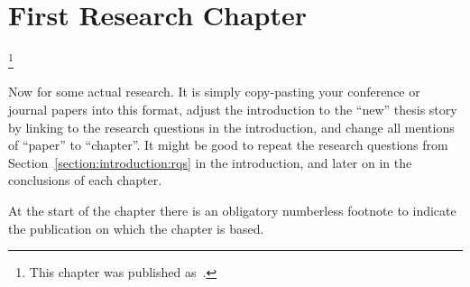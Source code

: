 
\chapter{First Research Chapter}
\label{chapter:research-01}

\footnote[]{This chapter was published as~.}
\acresetall


Now for some actual research. It is simply copy-pasting your conference or journal papers into this format, adjust the introduction to the ``new'' thesis story by linking to the research questions in the introduction, and change all mentions of ``paper'' to ``chapter''. It might be good to repeat the research questions from Section~\ref{section:introduction:rqs} in the introduction, and later on in the conclusions of each chapter.

At the start of the chapter there is an obligatory numberless footnote to indicate the publication on which the chapter is based.
